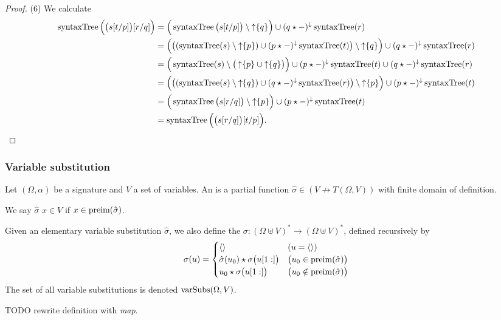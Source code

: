 \begin{proof}
(6) We calculate
\begin{align*}
\operatorname{syntaxTree}\Big(\big(s[t/p]\big)[r/q]\Big) &= \Big(\operatorname{syntaxTree}\big(s[t/p]\big) \setminus \operatorname{\uparrow}\{q\}\Big) \cup (q\star -)^\downarrow\operatorname{syntaxTree}(r) \\
&= \Big(\big((\operatorname{syntaxTree}(s)\setminus \operatorname{\uparrow}\{p\}) \cup (p\star -)^\downarrow\operatorname{syntaxTree}(t) \big) \setminus \operatorname{\uparrow}\{q\}\Big) \cup (q\star -)^\downarrow\operatorname{syntaxTree}(r) \\
&= \Big(\operatorname{syntaxTree}(s)\setminus \big(\operatorname{\uparrow}\{p\} \cup \operatorname{\uparrow}\{q\} \big)\Big) \cup (p\star -)^\downarrow\operatorname{syntaxTree}(t) \cup (q\star -)^\downarrow\operatorname{syntaxTree}(r) \\
&= \Big(\big((\operatorname{syntaxTree}(s)\setminus \operatorname{\uparrow}\{q\}) \cup (q\star -)^\downarrow\operatorname{syntaxTree}(r) \big) \setminus \operatorname{\uparrow}\{p\}\Big) \cup (p\star -)^\downarrow\operatorname{syntaxTree}(t) \\
&= \Big(\operatorname{syntaxTree}\big(s[r/q]\big) \setminus \operatorname{\uparrow}\{p\}\Big) \cup (p\star -)^\downarrow\operatorname{syntaxTree}(t) \\
&= \operatorname{syntaxTree}\Big(\big(s[r/q]\big)[t/p]\Big).
\end{align*}
\end{proof}

\subsubsection{Variable substitution}
\begin{definition}
Let $(\Omega, \alpha)$ be a signature and $V$ a set of variables. An  is a partial function $\hat{\sigma}\in(V\not\to T(\Omega, V))$ with finite domain of definition.

We say $\hat{\sigma}$  $x\in V$ if $x\in \operatorname{preim}(\hat{\sigma})$.

Given an elementary variable substitution $\hat{\sigma}$, we also define the  $\sigma: (\Omega \uplus V)^*\to (\Omega \uplus V)^*$, defined recursively by
\[ \sigma(u) = \begin{cases}
\left\langle  \right\rangle & (u = \left\langle  \right\rangle) \\
\hat{\sigma}(u_0)\star \sigma\big(u[1:]\big) & \big(u_0\in \operatorname{preim}(\hat{\sigma})\big) \\
u_0\star \sigma\big(u[1:]\big) & \big(u_0\notin \operatorname{preim}(\hat{\sigma})\big)
\end{cases} \]
The set of all variable substitutions is denoted $\operatorname{varSubs}(\Omega, V)$.
\end{definition}
TODO rewrite definition with \emph{map}.

